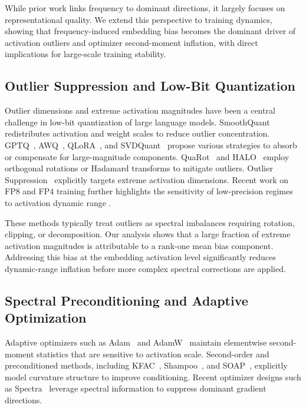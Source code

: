 While prior work links frequency to dominant directions,
it largely focuses on representational quality.
We extend this perspective to training dynamics,
showing that frequency-induced embedding bias becomes the dominant driver
of activation outliers and optimizer second-moment inflation,
with direct implications for large-scale training stability.

\subsection{Outlier Suppression and Low-Bit Quantization}

Outlier dimensions and extreme activation magnitudes have been a central
challenge in low-bit quantization of large language models.
SmoothQuant~\cite{xiao2023smoothquant} redistributes activation and weight
scales to reduce outlier concentration.
GPTQ~\cite{frantar2022gptq}, AWQ~\cite{lin2024awq}, QLoRA~\cite{dettmers2023qlora},
and SVDQuant~\cite{li2024svdquant}
propose various strategies to absorb or compensate for large-magnitude
components.
QuaRot~\cite{ashkboos2024quarot} and HALO~\cite{ashkboos2025halo}
employ orthogonal rotations or Hadamard transforms to mitigate outliers.
Outlier Suppression~\cite{wei2023outlier} explicitly targets extreme
activation dimensions.
Recent work on FP8 and FP4 training further highlights the sensitivity of
low-precision regimes to activation dynamic range
\cite{micikevicius2022fp8,peng2023fp8,perez2023fp8,cao2025metis}.

These methods typically treat outliers as spectral imbalances requiring
rotation, clipping, or decomposition.
Our analysis shows that a large fraction of extreme activation magnitudes
is attributable to a rank-one mean bias component.
Addressing this bias at the embedding activation level
significantly reduces dynamic-range inflation before more complex spectral
corrections are applied.

\subsection{Spectral Preconditioning and Adaptive Optimization}

Adaptive optimizers such as Adam~\cite{kingma2014adam}
and AdamW~\cite{loshchilov2017adamw}
maintain elementwise second-moment statistics that are sensitive to
activation scale.
Second-order and preconditioned methods, including KFAC~\cite{martens2015kfac},
Shampoo~\cite{gupta2018shampoo}, and SOAP~\cite{vyas2024soap},
explicitly model curvature structure to improve conditioning.
Recent optimizer designs such as Spectra~\cite{spectra2026}
leverage spectral information to suppress dominant gradient directions.

